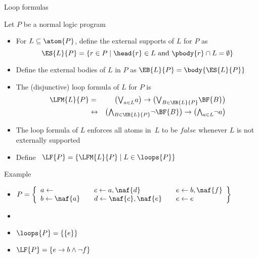 \begin{frame}{Loop formulas}

  Let $P$ be a normal logic program
  \begin{itemize}
  \item <1->
    For $L\subseteq\atom{P}$,
    define the \alert<1-2>{external supports} of $L$ for $P$ as
    \[
    \ES{L}{P}
    =
    \{  r\in P\mid\head{r}\in L\text{ and } \pbody{r}\cap L=\emptyset  \}
    \]
  \item<2-> Define the \alert{external bodies} of $L$ in $P$ as
    \(
    \EB{L}{P}=\body{\ES{L}{P}}
    \)
  \item<3->
    The (disjunctive) \alert{loop formula} of $L$ for $P$ is
    \begin{eqnarray*}
      \LFM{L}{P}
      & = &
      \big(
      \textstyle{\bigvee_{a\in L}} a
      \big)
      \rightarrow
      \big(
      \textstyle{\bigvee_{B\in\EB{L}{P}}}\BF{B}
      \big)
      \\
      & \leftrightarrow &
      \big(
      \textstyle{\bigwedge_{B\in\EB{L}{P}}}\neg \BF{B}
      \big)
      \rightarrow
      \big(
      \textstyle{\bigwedge_{a\in L}}\neg a
      \big)
    \end{eqnarray*}
  \item<4-> 
    The loop formula of $L$ enforces
    all atoms in~$L$ to be $\mathit{false}$
    whenever $L$ is not externally supported
  \item<4->
    Define \
    \(
    \LF{P} = \{  \LFM{L}{P} \mid L \in \loops{P}  \}
    \)
  \end{itemize}
\end{frame}
\begin{frame}[c]{Example}
  \bigskip
  \begin{itemize}
  \item<1->
  \(
  P
  =
  \left\{
    \begin{array}{lll}
      a \leftarrow                  \quad &
      c \leftarrow a, \naf{d}       \quad &
      e \leftarrow b, \naf{f}
      \\
      b \leftarrow \naf{a}          \quad &
      d \leftarrow \naf{c}, \naf{e} \quad &
      e \leftarrow e
    \end{array}
  \right\}
  \)
  \bigskip
  \item<1-> []
    \begin{center}
    
    \end{center}
  \item<1-> $\loops{P}=\{\{e\}\}$
  \item<2-> $\LF{P}=\{e\rightarrow b\wedge\neg f\}$
\end{itemize}
\end{frame}
